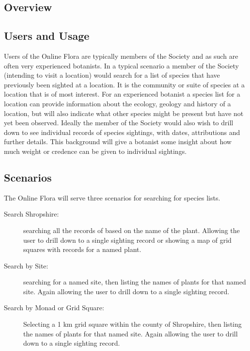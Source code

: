 \documentclass[a4paper,12pt,landscape]{article}
\begin{document}
\begin{multicols*}{2}
  \section{Overview}

  \subsection{Users and Usage}
  Users of the Online Flora are typically
  members of the Society
  and
  as such are often very experienced botanists.
  In a typical scenario a member of the Society
  (intending to visit a location)
  would search for a list of species that have previously
  been sighted at a location.
  It is the community or suite of species at a location that is of most interest.
  For an experienced botanist a species list for a location
  can provide information about
  the ecology, geology and history of a location,
  but will also indicate what other species might be present but have not yet been observed.
  Ideally the member of the Society
  would also wish to drill down to see individual records of species sightings,
  with dates, attributions and further details.
  This background will give a botanist
  some insight about how much weight or credence can be given to individual sightings.

  \subsection{Scenarios}

  The Online Flora will serve three scenarios for
  searching for species lists.

  \begin{description}
      \item[Search Shropshire:]
        searching all the records of based on the name of the plant.
        Allowing the user to drill down to a single sighting record
        or
        showing a map of grid squares with records for a named plant.
      \item[Search by Site:]
        searching for a named site,
        then listing the names of plants for that named site.
        Again allowing the user to drill down to a single sighting record.
      \item[Search by Monad or Grid Square:]
        Selecting a 1 km grid square within the county of Shropshire,
        then listing the names of plants for that named site.
        Again allowing the user to drill down to a single sighting record.
  \end{description}


\end{multicols*}
\end{document}
